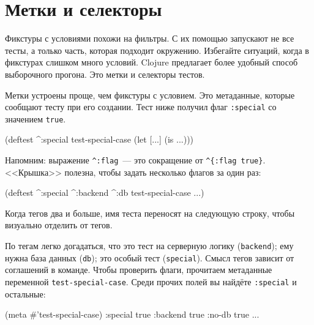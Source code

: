 \section{Метки и селекторы}


Фикстуры с условиями похожи на фильтры. С их помощью запускают не все тесты, а
только часть, которая подходит окружению. Избегайте ситуаций, когда в фикстурах
слишком много условий. Clojure предлагает более удобный способ выборочного
прогона. Это метки и селекторы тестов.

Метки устроены проще, чем фикстуры с условием. Это метаданные, которые сообщают
тесту при его создании. Тест ниже получил флаг \verb|:special| со значением
\verb|true|.

\begin{english}
  \begin{clojure}
(deftest ^:special test-special-case
  (let [...]
    (is ...)))
  \end{clojure}
\end{english}


Напомним: выражение \verb|^:flag|~--- это сокращение от \verb|^{:flag true}|.
<<Крышка>> полезна, чтобы задать несколько флагов за один раз:

\begin{english}
  \begin{clojure}
(deftest ^:special ^:backend ^:db
  test-special-case
  ...)
  \end{clojure}
\end{english}

\noindent
Когда тегов два и больше, имя теста переносят на следующую строку, чтобы
визуально отделить от тегов.

По тегам легко догадаться, что это тест на серверную логику (\verb|backend|);
ему нужна база данных (\verb|db|); это особый тест (\verb|special|). Смысл
тегов зависит от соглашений в команде. Чтобы проверить флаги, прочитаем
метаданные переменной \verb|test-special-case|. Среди прочих полей вы найдёте
\verb|:special| и остальные:

\ifx\DEVICETYPE\MOBILE

\begin{english}
  \begin{clojure}
(meta #'test-special-case)
{:special true
 :backend true
 :no-db true ...}
  \end{clojure}
\end{english}

